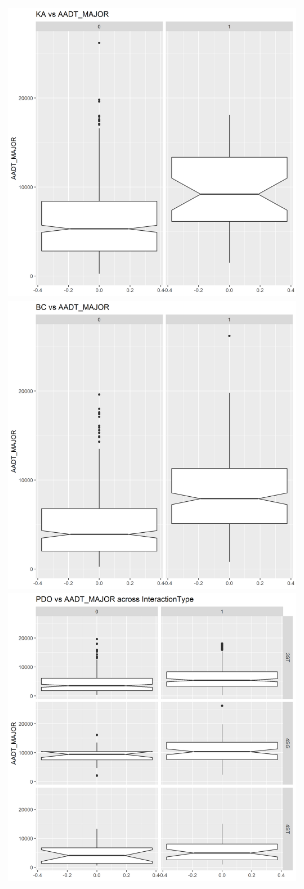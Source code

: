 \documentclass[11pt]{scrartcl} %
\begin{document}
\begin{figure}[H]
\begin{minipage}[t]{0.5\linewidth}
\centering
\includegraphics[width=3in]{image/extra1.png}
\small
\end{minipage}
\begin{minipage}[t]{0.5\linewidth}
\centering
\includegraphics[width=3in]{image/extra2.png}
\small
\end{minipage}
\begin{minipage}[t]{0.5\linewidth}
\centering
\includegraphics[width=3in]{image/extra3.png}

\end{minipage}
\end{figure}
\end{document}
